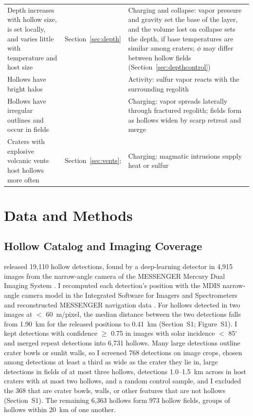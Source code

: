 \documentclass[article,review]{planetary}
\begin{document}
\begin{table}[!ht]
{\begin{tabularx}{\textwidth}{>{\raggedright\arraybackslash}p{4.0cm} >{\raggedright\arraybackslash}X >{\raggedright\arraybackslash}p{5.0cm}}
            Depth increases with hollow size, is set locally, and varies little with temperature and host size & Section~\ref{sec:depth} & Charging and collapse: vapor pressure and gravity set the base of the layer, and the volume lost on collapse sets the depth, if base temperatures are similar among craters; $\phi$ may differ between hollow fields (Section~\ref{sec:depthcontrol}) \\
            Hollows have bright halos & \textcite{blewett2011,blewett2013,blewett2016} & Activity: sulfur vapor reacts with the surrounding regolith \\
            Hollows have irregular outlines and occur in fields & \textcite{blewett2011} & Charging: vapor spreads laterally through fractured regolith; fields form as hollows widen by scarp retreat and merge \\
            Craters with explosive volcanic vents host hollows more often & Section~\ref{sec:vents}; \textcite{pegg2021} & Charging: magmatic intrusions supply heat or sulfur \\
            \hline
        \end{tabularx}}
    \label{tab:constraints}
\end{table}

\FloatBarrier
\section{Data and Methods}
\label{sec:methods}

\subsection{Hollow Catalog and Imaging Coverage}
\label{sec:catalog}
\textcite{bickel2025} released 19,110 hollow detections, found by a deep-learning detector in 4,915 images from the narrow-angle camera of the MESSENGER Mercury Dual Imaging System \parencite[MDIS;][]{hawkins2007}. I recomputed each detection's position with the MDIS narrow-angle camera model in the Integrated Software for Imagers and Spectrometers \parencite[ISIS;][]{isis2023} and reconstructed MESSENGER navigation data \parencite{spice_messenger}. For hollows detected in two images at $<$ 60~m/pixel, the median distance between the two detections falls from 1.90~km for the released positions to 0.41~km (Section~S1; Figure~S1). I kept detections with confidence $\geq$ 0.75 in images with solar incidence $<$ 85$^\circ$ and merged repeat detections into 6,731 hollows. Many large detections outline crater bowls or sunlit walls, so I screened 768 detections on image crops, chosen among detections at least a third as wide as the crater they lie in, large detections in fields of at most three hollows, detections 1.0--1.5~km across in host craters with at most two hollows, and a random control sample, and I excluded the 368 that are crater bowls, walls, or other features that are not hollows (Section~S1). The remaining 6,363 hollows form 973 hollow fields, groups of hollows within 20~km of one another.
\end{document}
